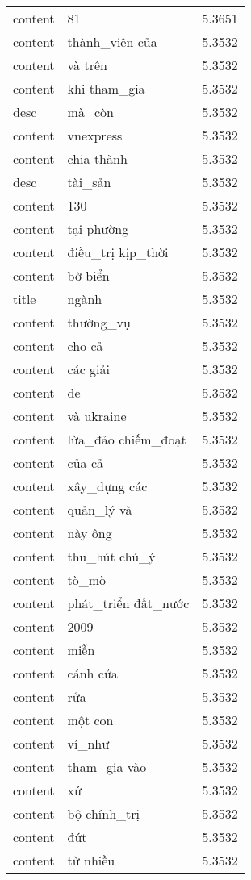 \documentclass{article}
\begin{document}
\begin{tabular}{lll}
content & 81 & 5.3651\\
content & thành\_viên của & 5.3532\\
content & và trên & 5.3532\\
content & khi tham\_gia & 5.3532\\
desc & mà\_còn & 5.3532\\
content & vnexpress & 5.3532\\
content & chia thành & 5.3532\\
desc & tài\_sản & 5.3532\\
content & 130 & 5.3532\\
content & tại phường & 5.3532\\
content & điều\_trị kịp\_thời & 5.3532\\
content & bờ biển & 5.3532\\
title & ngành & 5.3532\\
content & thường\_vụ & 5.3532\\
content & cho cả & 5.3532\\
content & các giải & 5.3532\\
content & de & 5.3532\\
content & và ukraine & 5.3532\\
content & lừa\_đảo chiếm\_đoạt & 5.3532\\
content & của cả & 5.3532\\
content & xây\_dựng các & 5.3532\\
content & quản\_lý và & 5.3532\\
content & này ông & 5.3532\\
content & thu\_hút chú\_ý & 5.3532\\
content & tò\_mò & 5.3532\\
content & phát\_triển đất\_nước & 5.3532\\
content & 2009 & 5.3532\\
content & miễn & 5.3532\\
content & cánh cửa & 5.3532\\
content & rửa & 5.3532\\
content & một con & 5.3532\\
content & ví\_như & 5.3532\\
content & tham\_gia vào & 5.3532\\
content & xứ & 5.3532\\
content & bộ chính\_trị & 5.3532\\
content & đứt & 5.3532\\
content & từ nhiều & 5.3532\\

\end{tabular}
\end{document}
